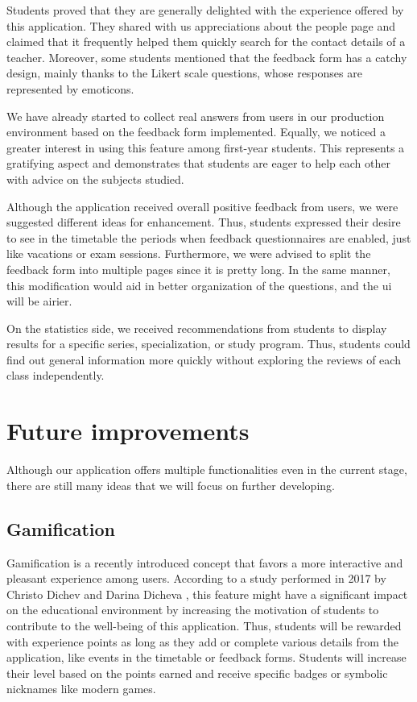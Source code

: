     Students proved that they are generally delighted with the experience offered by this application. They shared with us appreciations about the people page and claimed that it frequently helped them quickly search for the contact details of a teacher. Moreover, some students mentioned that the feedback form has a catchy design, mainly thanks to the Likert scale questions, whose responses are represented by emoticons.
    
    We have already started to collect real answers from users in our production environment based on the feedback form implemented. Equally, we noticed a greater interest in using this feature among first-year students. This represents a gratifying aspect and demonstrates that students are eager to help each other with advice on the subjects studied.
    
    Although the application received overall positive feedback from users, we were suggested different ideas for enhancement. Thus, students expressed their desire to see in the timetable the periods when feedback questionnaires are enabled, just like vacations or exam sessions. Furthermore, we were advised to split the feedback form into multiple pages since it is pretty long. In the same manner, this modification would aid in better organization of the questions, and the \acrshort{ui} will be airier.
    
    On the statistics side, we received recommendations from students to display results for a specific series, specialization, or study program. Thus, students could find out general information more quickly without exploring the reviews of each class independently.

\section{Future improvements} \label{6:improvements}

    Although our application offers multiple functionalities even in the current stage, there are still many ideas that we will focus on further developing.
    
    \subsection{Gamification} \label{6:gamification}
    
    Gamification is a recently introduced concept that favors a more interactive and pleasant experience among users. According to a study performed in 2017 by Christo Dichev and Darina Dicheva \cite{dichev2017gamification}, this feature might have a significant impact on the educational environment by increasing the motivation of students to contribute to the well-being of this application. Thus, students will be rewarded with experience points as long as they add or complete various details from the application, like events in the timetable or feedback forms. Students will increase their level based on the points earned and receive specific badges or symbolic nicknames like modern games.
    
